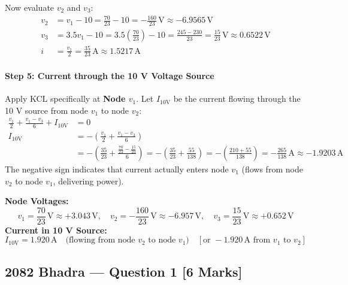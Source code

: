 \documentclass[11pt,a4paper,oneside]{article}
\begin{document}
Now evaluate $v_2$ and $v_3$:
\begin{align*}
  v_2 &= v_1 - 10 = \frac{70}{23} - 10 = -\frac{160}{23}\,\mathrm{V} \approx -6.9565\,\mathrm{V} \\
  v_3 &= 3.5 v_1 - 10 = 3.5\left(\frac{70}{23}\right) - 10 = \frac{245 - 230}{23} = \frac{15}{23}\,\mathrm{V} \approx 0.6522\,\mathrm{V} \\
  i &= \frac{v_1}{2} = \frac{35}{23}\,\mathrm{A} \approx 1.5217\,\mathrm{A}
\end{align*}

\paragraph{Step 5: Current through the 10 V Voltage Source}
Apply KCL specifically at \textbf{Node $v_1$}. Let $I_{10\text{V}}$ be the current flowing through the 10 V source from node $v_1$ to node $v_2$:
\begin{align*}
  \frac{v_1}{2} + \frac{v_1 - v_3}{6} + I_{10\text{V}} &= 0 \\
  I_{10\text{V}} &= -\left(\frac{v_1}{2} + \frac{v_1 - v_3}{6}\right) \\
  &= -\left(\frac{35}{23} + \frac{\frac{70}{23} - \frac{15}{23}}{6}\right) = -\left(\frac{35}{23} + \frac{55}{138}\right) = -\left(\frac{210 + 55}{138}\right) = -\frac{265}{138}\,\mathrm{A} \approx -1.9203\,\mathrm{A}
\end{align*}
The negative sign indicates that current actually enters node $v_1$ (flows from node $v_2$ to node $v_1$, delivering power).

\begin{answerbox}
\textbf{Node Voltages:}
\[
v_1 = \frac{70}{23}\,\mathrm{V} \approx +3.043\,\mathrm{V}, \quad v_2 = -\frac{160}{23}\,\mathrm{V} \approx -6.957\,\mathrm{V}, \quad v_3 = \frac{15}{23}\,\mathrm{V} \approx +0.652\,\mathrm{V}
\]
\textbf{Current in 10 V Source:}
\[
I_{10\text{V}} = 1.920\,\mathrm{A} \quad \text{(flowing from node $v_2$ to node $v_1$)} \quad \left[\text{or } -1.920\,\mathrm{A}\text{ from } v_1 \text{ to } v_2\right]
\]
\end{answerbox}

\newpage

\subsection{2082 Bhadra --- Question 1 [6 Marks]}
\end{document}
